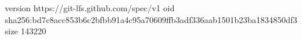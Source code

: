 version https://git-lfs.github.com/spec/v1
oid sha256:bd7c8acc853b6c2bfbb91a4c95a70609ffb3adf336aab1501b23ba1834850df3
size 143220
